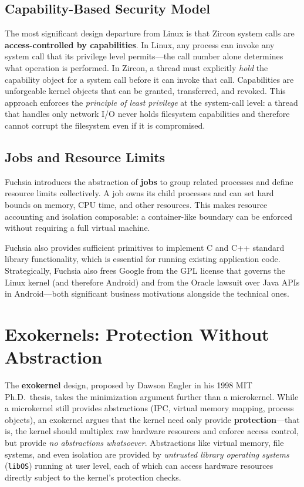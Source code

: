 \documentclass[11pt]{article}
\begin{document}
\subsection{Capability-Based Security Model}

The most significant design departure from Linux is that Zircon system calls are \textbf{access-controlled by capabilities}. In Linux, any process can invoke any system call that its privilege level permits---the call number alone determines what operation is performed. In Zircon, a thread must explicitly \emph{hold} the capability object for a system call before it can invoke that call. Capabilities are unforgeable kernel objects that can be granted, transferred, and revoked. This approach enforces the \emph{principle of least privilege} at the system-call level: a thread that handles only network I/O never holds filesystem capabilities and therefore cannot corrupt the filesystem even if it is compromised.

\subsection{Jobs and Resource Limits}

Fuchsia introduces the abstraction of \textbf{jobs} to group related processes and define resource limits collectively. A job owns its child processes and can set hard bounds on memory, CPU time, and other resources. This makes resource accounting and isolation composable: a container-like boundary can be enforced without requiring a full virtual machine.

Fuchsia also provides sufficient primitives to implement C and C++ standard library functionality, which is essential for running existing application code. Strategically, Fuchsia also frees Google from the GPL license that governs the Linux kernel (and therefore Android) and from the Oracle lawsuit over Java APIs in Android---both significant business motivations alongside the technical ones.

\section{Exokernels: Protection Without Abstraction}

The \textbf{exokernel} design, proposed by Dawson Engler in his 1998 MIT Ph.D.\ thesis, takes the minimization argument further than a microkernel. While a microkernel still provides abstractions (IPC, virtual memory mapping, process objects), an exokernel argues that the kernel need only provide \textbf{protection}---that is, the kernel should multiplex raw hardware resources and enforce access control, but provide \emph{no abstractions whatsoever}. Abstractions like virtual memory, file systems, and even isolation are provided by \emph{untrusted library operating systems} (\texttt{libOS}) running at user level, each of which can access hardware resources directly subject to the kernel's protection checks.
\end{document}
